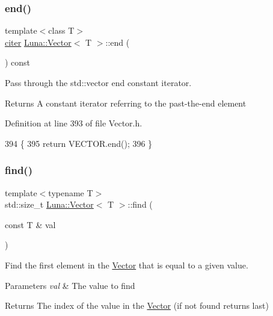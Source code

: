 \subsubsection{\texorpdfstring{end()}{end()}\hspace{0.1cm}{\footnotesize\ttfamily [2/2]}}
{\footnotesize\ttfamily template$<$class T$>$ \\
\hyperlink{classLuna_1_1Vector_a90cff5eab2782bc1c6aaa879ce18a2b8}{citer} \hyperlink{classLuna_1_1Vector}{Luna\+::\+Vector}$<$ T $>$\+::end (\begin{DoxyParamCaption}{ }\end{DoxyParamCaption}) const\hspace{0.3cm}{\ttfamily [inline]}}



Pass through the std\+::vector end constant iterator. 

\begin{DoxyReturn}{Returns}
A constant iterator referring to the past-\/the-\/end element 
\end{DoxyReturn}


Definition at line 393 of file Vector.\+h.


\begin{DoxyCode}
394     \{
395       \textcolor{keywordflow}{return} VECTOR.end();
396     \}
\end{DoxyCode}
\mbox{\label{classLuna_1_1Vector_a3400289dadcbd252a7cc5401e81a7dbb}} 
\subsubsection{\texorpdfstring{find()}{find()}}
{\footnotesize\ttfamily template$<$typename T$>$ \\
std\+::size\+\_\+t \hyperlink{classLuna_1_1Vector}{Luna\+::\+Vector}$<$ T $>$\+::find (\begin{DoxyParamCaption}\item[{const T \&}]{val }\end{DoxyParamCaption})\hspace{0.3cm}{\ttfamily [inline]}}



Find the first element in the \hyperlink{classLuna_1_1Vector}{Vector} that is equal to a given value. 


\begin{DoxyParams}{Parameters}
{\em val} & The value to find \\
\hline
\end{DoxyParams}
\begin{DoxyReturn}{Returns}
The index of the value in the \hyperlink{classLuna_1_1Vector}{Vector} (if not found returns last) 
\end{DoxyReturn}


